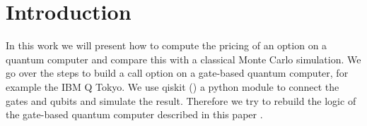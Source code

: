 \documentclass[../main.tex]{subfiles}
\begin{document}
\section{Introduction}\label{sec: introduction}
In this work we will present how to compute the pricing of an option on a quantum computer and compare this with a classical Monte Carlo simulation. We go over the steps to build a call option on a gate-based quantum computer, for example the IBM Q Tokyo. We use qiskit (\cite{Qiskit}) a python module to connect the gates and qubits and simulate the result. Therefore we try to rebuild the logic of the gate-based quantum computer described in this paper \cite{Stamatopoulos_2019}.
\biblio
\end{document}
